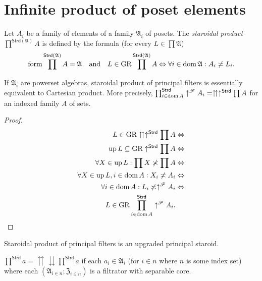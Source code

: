 \section{Infinite product of poset elements}

Let $A_{i}$ be a family of elements of
a family $\mathfrak{A}_{i}$ of posets. The \emph{staroidal product}
$\prod^{\mathsf{Strd}(\mathfrak{A})}A$ is defined by the formula
(for every $L\in\prod\mathfrak{A}$)
\[
\operatorname{form}\prod^{\mathsf{Strd}(\mathfrak{A})}A=\mathfrak{A}\hspace{1em}\text{and}\hspace{1em}L\in\operatorname{GR}\prod^{\mathsf{Strd}(\mathfrak{A})}A\Leftrightarrow\forall i\in\operatorname{dom}\mathfrak{A}:A_{i}\not\asymp L_{i}.
\]

\begin{prop}
If $\mathfrak{A}_{i}$ are powerset algebras, staroidal product of
principal filters is essentially equivalent to Cartesian product.
More precisely, $\prod_{i\in\operatorname{dom} A}^{\mathsf{Strd}}\uparrow^{\mathscr{F}}A_{i}=\upuparrows\uparrow^{\mathsf{Strd}}\prod A$
for an indexed family $A$ of sets.\end{prop}
\begin{proof}
~
\begin{align*}
L\in\operatorname{GR}\upuparrows\uparrow^{\mathsf{Strd}}\prod A & \Leftrightarrow\\
\operatorname{up} L\subseteq\operatorname{GR}\uparrow^{\mathsf{Strd}}\prod A & \Leftrightarrow\\
\forall X\in\operatorname{up} L:\prod X\not\asymp\prod A & \Leftrightarrow\\
\forall X\in\operatorname{up} L,i\in\operatorname{dom} A:X_{i}\not\asymp A_{i} & \Leftrightarrow\\
\forall i\in\operatorname{dom} A:L_{i}\not\asymp\uparrow^{\mathscr{F}}A_{i} & \Leftrightarrow\\
L\in\operatorname{GR}\prod_{i\in\operatorname{dom} A}^{\mathsf{Strd}}\uparrow^{\mathscr{F}}A_{i}.
\end{align*}
\end{proof}
\begin{cor}
Staroidal product of principal filters is an upgraded principal staroid.\end{cor}
\begin{prop}
\label{up-down-fcd}$\prod^{\mathsf{Strd}}a=\upuparrows\downdownarrows\prod^{\mathsf{Strd}}a$
if each $a_{i}\in\mathfrak{A}_{i}$ (for $i\in n$ where $n$ is some
index set) where each $(\mathfrak{A}_{i\in n};\mathfrak{Z}_{i\in n})$
is a filtrator with separable core.\end{prop}
